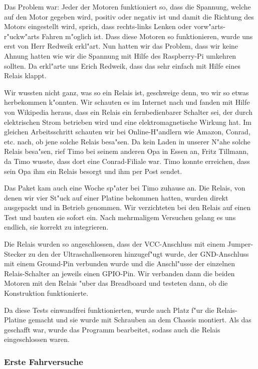 \documentclass[a4paper,12pt]{article}
\begin{document}
Das Problem war: Jeder der Motoren funktioniert so, dass die Spannung, welche auf den Motor gegeben wird, positiv oder negativ ist und damit die Richtung des Motors eingestellt wird, sprich, dass rechts-links Lenken oder vorw"arts-r"uckw"arts Fahren m"oglich ist.
Dass diese Motoren so funktionieren, wurde uns erst von Herr Redweik erkl"art.
Nun hatten wir das Problem, dass wir keine Ahnung hatten wie wir die Spannung mit Hilfe des Raspberry-Pi umkehren sollten.
Da erkl"arte uns Erich Redweik, dass das sehr einfach mit Hilfe eines Relais klappt.

Wir wussten nicht ganz, was so ein Relais ist, geschweige denn, wo wir so etwas herbekommen k"onnten.
Wir schauten es im Internet nach und fanden mit Hilfe von Wikipedia heraus, dass ein Relais ein fernbedienbarer Schalter sei, der durch elektrischen Strom betrieben wird und eine elektromagnetische Wirkung hat.
Im gleichen Arbeitsschritt schauten wir bei Online-H"andlern wie Amazon, Conrad, etc. nach, ob jene solche Relais besa"sen.
Da kein Laden in unserer N"ahe solche Relais besa"sen, rief Timo bei seinem anderen Opa in Essen an, Fritz Tillmann, da Timo wusste, dass dort eine Conrad-Filiale war.
Timo konnte erreichen, dass sein Opa ihm ein Relais besorgt und ihm per Post sendet.

Das Paket kam auch eine Woche sp"ater bei Timo zuhause an.
Die Relais, von denen wir vier St"uck auf einer Platine bekommen hatten, wurden direkt ausgepackt und in Betrieb genommen.
Wir verzichteten bei den Relais auf einen Test und bauten sie sofort ein.
Nach mehrmaligem Versuchen gelang es uns endlich, sie korrekt zu integrieren.

Die Relais wurden so angeschlossen, dass der VCC-Anschluss mit einem Jumper-Stecker zu den der Ultraschallsensoren hinzugef"ugt wurde, der GND-Anschluss mit einem Ground-Pin verbunden wurde und die Anschl"usse der einzelnen Relais-Schalter an jeweils einen GPIO-Pin.
Wir verbanden dann die beiden Motoren mit den Relais "uber das Breadboard und testeten dann, ob die Konstruktion funktionierte.

Da diese Tests einwandfrei funktionierten, wurde auch Platz f"ur die Relais-Platine gemacht und sie wurde mit Schrauben an dem Chassis montiert.
Als das geschafft war, wurde das Programm bearbeitet, sodass auch die Relais eingeschlossen waren.

\subsubsection{Erste Fahrversuche}\label{sec2.1.5}
\end{document}
